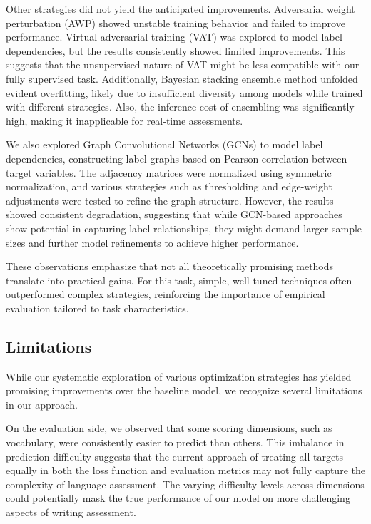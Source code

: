 \documentclass[12pt]{article}
\begin{document}
Other strategies did not yield the anticipated improvements. Adversarial weight perturbation (AWP) showed unstable training behavior and failed to improve performance. Virtual adversarial training (VAT) was explored to model label dependencies, but the results consistently showed limited improvements. This suggests that the unsupervised nature of VAT might be less compatible with our fully supervised task. Additionally, Bayesian stacking ensemble method unfolded evident overfitting, likely due to insufficient diversity among models while trained with different strategies. Also, the inference cost of ensembling was significantly high, making it inapplicable for real-time assessments.

We also explored Graph Convolutional Networks (GCNs) to model label dependencies, constructing label graphs based on Pearson correlation between target variables. The adjacency matrices were normalized using symmetric normalization, and various strategies such as thresholding and edge-weight adjustments were tested to refine the graph structure. However, the results showed consistent degradation, suggesting that while GCN-based approaches show potential in capturing label relationships, they might demand larger sample sizes and further model refinements to achieve higher performance.

These observations emphasize that not all theoretically promising methods translate into practical gains. For this task, simple, well-tuned techniques often outperformed complex strategies, reinforcing the importance of empirical evaluation tailored to task characteristics.

\subsection{Limitations}

While our systematic exploration of various optimization strategies has yielded promising improvements over the baseline model, we recognize several limitations in our approach. 

On the evaluation side, we observed that some scoring dimensions, such as vocabulary, were consistently easier to predict than others. This imbalance in prediction difficulty suggests that the current approach of treating all targets equally in both the loss function and evaluation metrics may not fully capture the complexity of language assessment. The varying difficulty levels across dimensions could potentially mask the true performance of our model on more challenging aspects of writing assessment.
\end{document}
